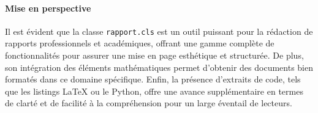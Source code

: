 \documentclass{mytex}
\begin{document}
	\paragraph*{Mise en perspective}
	Il est évident que la classe \texttt{rapport.cls} est un outil puissant pour la rédaction de rapports professionnels et académiques, offrant une gamme complète de fonctionnalités pour assurer une mise en page esthétique et structurée. De plus, son intégration des éléments mathématiques permet d'obtenir des documents bien formatés dans ce domaine spécifique. Enfin, la présence d'extraits de code, tels que les listings LaTeX ou le Python, offre une avance supplémentaire en termes de clarté et de facilité à la compréhension pour un large éventail de lecteurs.
	
	\merci
	
\end{document}
